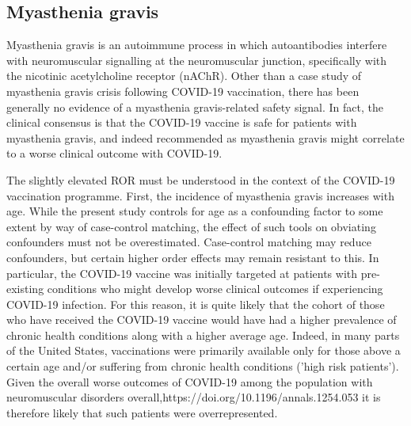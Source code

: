 \documentclass{article}
\begin{document}
\subsection{Myasthenia gravis}

Myasthenia gravis is an autoimmune process in which autoantibodies interfere with neuromuscular signalling at the neuromuscular junction, specifically with the nicotinic acetylcholine receptor (nAChR).\cite{conti2006myasthenia}
Other than a case study of myasthenia gravis crisis following COVID-19 vaccination,\cite{Tagliaferri_2021} there has been generally no evidence of a myasthenia gravis-related safety signal.
In fact, the clinical consensus is that the COVID-19 vaccine is safe for patients with myasthenia gravis, and indeed recommended as myasthenia gravis might correlate to a worse clinical outcome with COVID-19.\cite{jacob2020guidance,vzivkovic2021doctor}

The slightly elevated ROR must be understood in the context of the COVID-19 vaccination programme.
First, the incidence of myasthenia gravis increases with age.\cite{https://doi.org/10.1196/annals.1254.053,phillips1992epidemiology}
While the present study controls for age as a confounding factor to some extent by way of case-control matching, the effect of such tools on obviating confounders must not be overestimated.\cite{mansournia2018case}
Case-control matching may reduce confounders, but certain higher order effects may remain resistant to this.
In particular, the COVID-19 vaccine was initially targeted at patients with pre-existing conditions who might develop worse clinical outcomes if experiencing COVID-19 infection.
For this reason, it is quite likely that the cohort of those who have received the COVID-19 vaccine would have had a higher prevalence of chronic health conditions along with a higher average age.
Indeed, in many parts of the United States, vaccinations were primarily available only for those above a certain age and/or suffering from chronic health conditions ('high risk patients').
Given the overall worse outcomes of COVID-19 among the population with neuromuscular disorders overall,{https://doi.org/10.1196/annals.1254.053} it is therefore likely that such patients were overrepresented.
\end{document}
